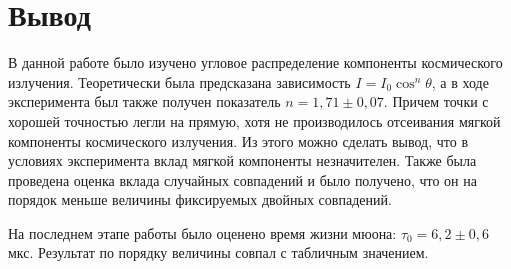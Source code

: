 \documentclass[a4paper,12pt]{article}
\begin{document}
	\section{Вывод}
	В данной работе было изучено угловое распределение компоненты космического излучения. Теоретически была предсказана зависимость $I = I_0 \cos^n\theta$, а в ходе эксперимента был также получен показатель $n = 1,71\pm0,07$. Причем точки с хорошей точностью легли на прямую, хотя не производилось отсеивания мягкой компоненты космического излучения. Из этого можно сделать вывод, что в условиях эксперимента вклад мягкой компоненты незначителен. Также была проведена оценка вклада случайных совпадений и было получено, что он на порядок меньше величины фиксируемых двойных совпадений.
	
	На последнем этапе работы было оценено время жизни мюона: $\tau_0 = 6,2\pm 0,6$мкс. Результат по порядку величины совпал с табличным значением.
	
	
\end{document}
